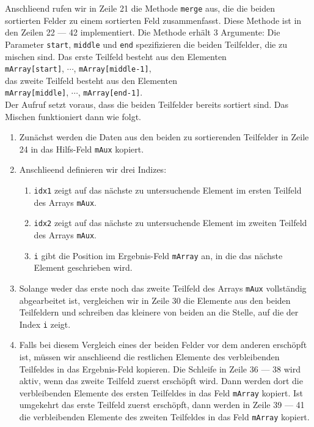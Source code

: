 Anschlie\3end rufen wir in Zeile 21 die Methode \texttt{merge} aus, die die beiden
sortierten Felder zu einem sortierten Feld zusammenfasst.  Diese Methode ist in den Zeilen
22 --- 42 implementiert.  Die Methode erh\"alt 3 Argumente: Die Parameter \texttt{start},
\texttt{middle} und \texttt{end} spezifizieren die beiden Teilfelder, die zu mischen sind.
Das erste Teilfeld besteht aus den Elementen \\[0.1cm]
\hspace*{1.3cm} \texttt{mArray[start]}, $\cdots$, \texttt{mArray[middle-1]}, \\[0.1cm]
das zweite Teilfeld besteht aus den Elementen \\[0.1cm]
\hspace*{1.3cm} \texttt{mArray[middle]}, $\cdots$, \texttt{mArray[end-1]}. \\[0.1cm]
Der Aufruf setzt voraus, dass die beiden Teilfelder bereits sortiert sind.
Das Mischen funktioniert dann wie folgt.
\begin{enumerate}
\item Zun\"achst werden die Daten aus den beiden zu sortierenden Teilfelder
      in Zeile 24 in das Hilfs-Feld \texttt{mAux} kopiert.
\item Anschlie\3end definieren wir drei Indizes:
      \begin{enumerate}
      \item \texttt{idx1} zeigt auf das n\"achste zu untersuchende Element im ersten
            Teilfeld des Arrays \texttt{mAux}.
      \item \texttt{idx2} zeigt auf das n\"achste zu untersuchende Element im zweiten
            Teilfeld des Arrays \texttt{mAux}.
      \item \texttt{i} gibt die Position im Ergebnis-Feld \texttt{mArray} an, in die das
            n\"achste Element geschrieben wird.
      \end{enumerate}
\item Solange weder das erste noch das zweite Teilfeld des Arrays \texttt{mAux}
      vollst\"andig abgearbeitet ist, vergleichen wir in Zeile 30 die Elemente aus den beiden Teilfeldern
      und schreiben das kleinere von beiden an die Stelle, auf die der Index \texttt{i} zeigt.
\item Falls bei diesem Vergleich eines der beiden Felder vor dem anderen ersch\"opft ist,
      m\"ussen wir anschlie\3end die restlichen Elemente des verbleibenden Teilfeldes
      in das Ergebnis-Feld kopieren.  Die Schleife in Zeile 36 --- 38 wird aktiv, wenn das
      zweite Teilfeld zuerst ersch\"opft wird.  Dann werden dort die verbleibenden Elemente
      des ersten Teilfeldes in das Feld \texttt{mArray} kopiert.  Ist umgekehrt das erste
      Teilfeld zuerst ersch\"opft, dann werden in Zeile 39 --- 41 die verbleibenden Elemente
      des zweiten Teilfeldes in das Feld \texttt{mArray} kopiert. 
\end{enumerate}
\pagebreak

